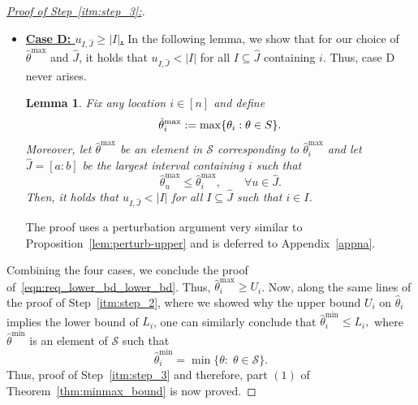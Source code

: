 \documentclass[11pt]{article}
\newcommand{\one}{\mathbf 1}
\newcommand{\cS}{\mathcal{S}}
\theoremstyle{plain}
\newtheorem{lemma}[theorem]{Lemma}
\theoremstyle{definition}
\theoremstyle{remark}
\begin{document}
\begin{proof}[\underline{Proof of Step~\ref{itm:step_3}:}]
\begin{itemize}
\begin{proof}[Proof of Proposition~\ref{lem:perturb-upper}]
\begin{lemma}\label{lemma:tv-bound-full-lemma}
    \begin{equation}\label{eq:tv-bound-full-lemma}
\lambda(\sigma_{c-1}\one\{c\neq 1\}-\sigma_d\one\{d\neq n\})\le 2\lambda C_{I,J},
\end{equation}
where the associated quantities are defined in Lemma~\ref{lemma:TV_is_affine}.
\end{lemma}
Plugging in \eqref{eq:data-bound-full} and \eqref{eq:tv-bound-full-lemma} in \eqref{eqn:phi_deriv}, we conclude that $\phi'_+(0)\le 0$. However, since $\hat\theta^{\max}$ minimizes $F$, $\phi'_+(0)\ge 0$. Thus, it must holds that $\phi'_+(0)=0$.
However, we have already argued that $\phi$ is affine on $[0,\eta_1]$. Therefore, it must hold that $\phi(t)=\phi(0)$ for $t\in[0,\eta_1]$. Choose $\varepsilon\in(0,\eta_1]$ and define
$\tilde\theta=\hat\theta^{\max}+\varepsilon\one_I$.
Then $\tilde\theta\in\mathcal \cS$ and
$\tilde\theta_i>\hat\theta_i^{\max}$,
contradiction! Thus, the assumption that $\hat\theta_i^{\max}<q$ must be wrong and thus, the proof of Proposition~\ref{lem:perturb-upper} is complete.
\end{proof}
\item \underline{\textbf{Case D: $ u_{I,\hat{J}}\geq |I|$.}}
In the following lemma, we show that for our choice of $\hat{\theta}^{\max}$ and $\hat{J}$, it holds that $u_{I,\hat{J}}<|I|$ for all $I\subseteq \hat{J}$ containing $i$. Thus, case D never arises.
\begin{lemma}\label{lem:J_hat_in_tilde_I}
    Fix any location $i \in [n]$ and define
    \[\hat\theta_i^{\max}:=\max\{\theta_i:\theta\in\mathcal \cS\}.\]
    Moreover, let $\hat{\theta}^{\max}$ be an element in $\cS$ corresponding to $\hat{\theta}^{\max}_i$ and let $\hat{J}=[a:b]$ be the \emph{largest} interval containing $i$ such that
\[
\hat\theta^{\max}_u\le \hat\theta^{\max}_i,\qquad \forall u\in \hat{J}.
\]
Then, it holds that $u_{I,\hat{J}}<|I|$ for all $I\subseteq \hat{J}$ such that $i\in I$.

\end{lemma}
The proof uses a perturbation argument very similar to Proposition~\ref{lem:perturb-upper} and is deferred to Appendix~\ref{appna}.

\end{itemize}
Combining the four cases, we conclude the proof of~\ref{eqn:req_lower_bd_lower_bd}. Thus, $\hat{\theta}^{\max}_i\geq U_i$. Now, along the same lines of the proof of Step~\ref{itm:step_2}, where we showed why the upper bound $U_i$ on $\hat{\theta}_i$ implies the lower bound of $L_i$, one can similarly conclude that \(\hat{\theta}^{\min}_i\leq L_i,\) where $\hat{\theta}^{\min}$ is an element of $\cS$ such that
\[\hat{\theta}^{\min}_i=\min\{\theta:\;\theta \in \cS\}.\]
Thus, proof of Step~\ref{itm:step_3} and therefore, part $(1)$ of Theorem~\ref{thm:minmax_bound} is now proved.
\end{proof}
\end{document}

